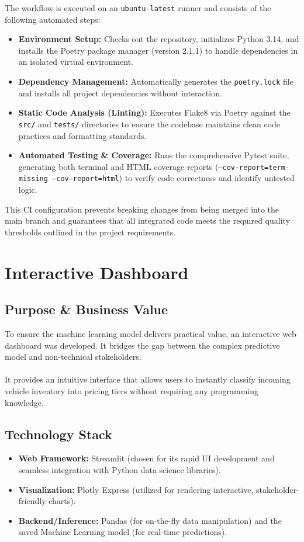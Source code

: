 \documentclass[12pt, a4paper]{article}
\begin{document}
The workflow is executed on an \texttt{ubuntu-latest} runner and consists of the following automated steps:
\begin{itemize}
    \item \textbf{Environment Setup:} Checks out the repository, initializes Python 3.14, and installs the Poetry package manager (version 2.1.1) to handle dependencies in an isolated virtual environment.
    \item \textbf{Dependency Management:} Automatically generates the \texttt{poetry.lock} file and installs all project dependencies without interaction.
    \item \textbf{Static Code Analysis (Linting):} Executes Flake8 via Poetry against the \texttt{src/} and \texttt{tests/} directories to ensure the codebase maintains clean code practices and formatting standards.
    \item \textbf{Automated Testing \& Coverage:} Runs the comprehensive Pytest suite, generating both terminal and HTML coverage reports (\texttt{--cov-report=term-missing --cov-report=html}) to verify code correctness and identify untested logic.
\end{itemize}
This CI configuration prevents breaking changes from being merged into the main branch and guarantees that all integrated code meets the required quality thresholds outlined in the project requirements.

\newpage
\section{Interactive Dashboard}

\subsection{Purpose \& Business Value}
To ensure the machine learning model delivers practical value, an interactive web dashboard was developed. It bridges the gap between the complex predictive model and non-technical stakeholders.\\
\\ It provides an intuitive interface that allows users to instantly classify incoming vehicle inventory into pricing tiers without requiring any programming knowledge.

\subsection{Technology Stack}
\begin{itemize}
  \item \textbf{Web Framework:} Streamlit (chosen for its rapid UI development and seamless integration with Python data science libraries).
  \item \textbf{Visualization:} Plotly Express (utilized for rendering interactive, stakeholder-friendly charts).
  \item \textbf{Backend/Inference:} Pandas (for on-the-fly data manipulation) and the saved Machine Learning model (for real-time predictions).
\end{itemize}
\end{document}
